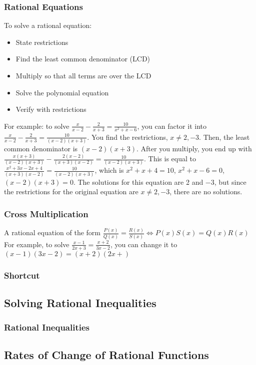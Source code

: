 \documentclass{article}
\begin{document}
	\subsubsection{Rational Equations}
	To solve a rational equation:
	\begin{itemize}
		\item State restrictions
		\item Find the least common denominator (LCD)
		\item Multiply so that all terms are over the LCD
		\item Solve the polynomial equation
		\item Verify with restrictions
	\end{itemize}
	For example: to solve $\frac{x}{x-2}-\frac{2}{x+3}=\frac{10}{x^2+x-6}$, you can factor it into $\frac{x}{x-2}-\frac{2}{x+3}=\frac{10}{(x-2)(x+3)}$. You find the restrictions, $x\neq2,-3$. Then, the least common denominator is $(x-2)(x+3)$. After you multiply, you end up with $\frac{x(x+3)}{(x-2)(x+3)}-\frac{2(x-2)}{(x+3)(x-2)}=\frac{10}{(x-2)(x+3)}$. This is equal to $\frac{x^2+3x-2x+4}{(x+3)(x-2)}=\frac{10}{(x-2)(x+3)}$, which is $x^2+x+4=10$, $x^2+x-6=0$, $(x-2)(x+3)=0$. The solutions for this equation are 2 and $-3$, but since the restrictions for the original equation are $x\neq2,-3$, there are no solutions.
	\subsubsection{Cross Multiplication}
	A rational equation of the form $\frac{P(x)}{Q(x)}=\frac{R(x)}{S(x)}\Leftrightarrow P(x)S(x)=Q(x)R(x)$\\
	For example, to solve $\frac{x-1}{2x+3}=\frac{x+2}{3x-2}$, you can change it to $(x-1)(3x-2)=(x+2)(2x+)$
	\subsubsection{Shortcut}
	\subsection{Solving Rational Inequalities}
	\subsubsection{Rational Inequalities}
	\subsection{Rates of Change of Rational Functions}
\end{document}
